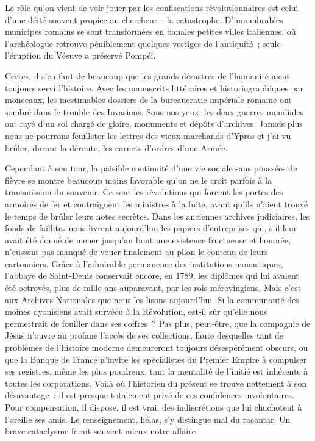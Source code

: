 \documentclass[french,twoside]{book} %
\newcommand{\astermono}{\medskip\centerline{\color{rubric}\large\selectfont{\syms ✻}}\medskip\par}%
\begin{document}
\astermono

\noindent Le rôle qu’on vient de voir jouer par les confiscations révolutionnaires est celui d’une déité souvent propice au chercheur : la catastrophe. D’in­nombrables municipes romains se sont transformées en banales petites villes italiennes, où l’archéologue retrouve péniblement quelques vestiges de l’antiquité ; seule l’éruption du Vésuve a préservé Pompéi.\par
Certes, il s’en faut de beaucoup que les grands désastres de l’humanité aient toujours servi l’histoire. Avec les manuscrits littéraires et historio­graphiques par monceaux, les inestimables dossiers de la bureaucratie impériale romaine ont sombré dans le trouble des Invasions. Sous nos yeux, les deux guerres mondiales ont rayé d’un sol chargé de gloire, monu­ments et dépôts d’archives. Jamais plus nous ne pourrons feuilleter les lettres des vieux marchands d’Ypres et j’ai vu brûler, durant la déroute, les carnets d’ordres d’une Armée.\par
Cependant à son tour, la paisible continuité d’une vie sociale sans poussées de fièvre se montre beaucoup moins favorable qu’on ne le croit parfois à la transmission du souvenir. Ce sont les révolutions qui forcent les portes des armoires de fer et contraignent les ministres à la fuite, avant qu’ils n’aient trouvé le temps de brûler leurs notes secrètes. Dans les anciennes archives judiciaires, les fonds de faillites nous livrent aujour­d’hui les papiers d’entreprises qui, s’il leur avait été donné de mener jusqu’au bout une existence fructueuse et honorée, n’eussent pas manqué de vouer finalement au pilon le contenu de leurs cartonniers. Grâce à l’admirable permanence des institutions monastiques, l’abbaye de Saint­-Denis conservait encore, en 1789, les diplômes qui lui avaient été octroyés, plus de mille ans auparavant, par les rois mérovingiens. Mais c’est aux Archives Nationales que nous les lisons aujourd’hui. Si la communauté  
\label{p32} des moines dyonisiens avait survécu à la Révolution, est‑il sûr qu’elle nous permettrait de fouiller dans ses coffres ? Pas plus, peut‑être, que la compagnie de Jésus n’ouvre au profane l’accès de ses collections, faute desquelles tant de problèmes de l’histoire moderne demeureront toujours désespérément obscurs, ou que la Banque de France n’invite les spécia­listes du Premier Empire à compulser ses registres, même les plus poudreux, tant la mentalité de l’initié est inhérente à toutes les corporations. Voilà où l’historien du présent se trouve nettement à son désavantage : il est presque totalement privé de ces confidences involontaires. Pour compen­sation, il dispose, il est vrai, des indiscrétions que lui chuchotent à l’oreille ses amis. Le renseignement, hélas, s’y distingue mal du racontar. Un brave cataclysme ferait souvent mieux notre affaire.\par
\end{document}
